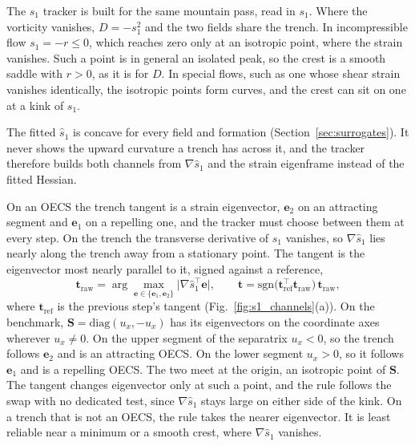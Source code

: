 \documentclass[lettersize,journal]{IEEEtran}
\begin{document}
The $s_1$ tracker is built for the same mountain pass, read in $s_1$.
Where the vorticity vanishes, $D = -s_1^2$ and the two fields share the
trench. In incompressible flow
$s_1 = -r \leq 0$, which reaches zero only at an isotropic point, where the
strain vanishes. Such a point is in general an isolated peak, so the crest
is a smooth saddle with $r > 0$, as it is for $D$. In special flows, such
as one whose shear strain vanishes identically, the isotropic points form
curves, and the crest can sit on one at a kink of $s_1$.

The fitted $\hat{s}_1$ is concave for every field and formation
(Section~\ref{sec:surrogates}). It never shows the upward curvature a
trench has across it, and the tracker therefore builds both channels from
$\nabla\hat{s}_1$ and the strain eigenframe instead of the fitted Hessian.

On an OECS the trench tangent is a strain eigenvector, $\mathbf{e}_2$ on
an attracting segment and $\mathbf{e}_1$ on a repelling one, and the
tracker must choose between them at every step. On the trench the
transverse derivative of $s_1$ vanishes, so $\nabla\hat{s}_1$ lies nearly
along the trench away from a stationary point. The tangent is the
eigenvector most nearly parallel to it, signed against a reference,
\begin{equation}
    \mathbf{t}_{\mathrm{raw}} =
    \arg\max_{\mathbf{e} \in \{\mathbf{e}_1, \mathbf{e}_2\}}
    \bigl\lvert \nabla\hat{s}_1^\top \mathbf{e} \bigr\rvert,
    \qquad
    \mathbf{t} = \mathrm{sgn}\bigl(\mathbf{t}_{\mathrm{ref}}^\top
    \mathbf{t}_{\mathrm{raw}}\bigr)\,\mathbf{t}_{\mathrm{raw}},
    \label{eq:tangent_select}
\end{equation}
where $\mathbf{t}_{\mathrm{ref}}$ is the previous step's tangent
(Fig.~\ref{fig:s1_channels}(a)). On the benchmark,
$\mathbf{S} = \mathrm{diag}(u_x, -u_x)$ has its eigenvectors on the
coordinate axes wherever $u_x \neq 0$. On the upper segment of the
separatrix $u_x < 0$, so the trench follows $\mathbf{e}_2$ and is an
attracting OECS. On the lower segment $u_x > 0$, so it follows
$\mathbf{e}_1$ and is a repelling OECS. The two meet at the origin, an
isotropic point of $\mathbf{S}$. The tangent changes eigenvector only at
such a point, and the rule follows the swap with no dedicated test,
since $\nabla\hat{s}_1$ stays large on either side of the kink. On a
trench that is not an OECS, the rule takes the nearer eigenvector. It is
least reliable near a minimum or a smooth crest, where $\nabla\hat{s}_1$
vanishes.
\end{document}
